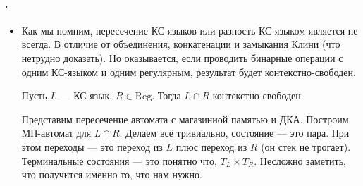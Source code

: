 \documentclass{article}
\begin{document}
    \paragraph{.}
    \begin{itemize}
        \item[]
        \begin{Comment}
            Как мы помним, пересечение КС-языков или разность КС-языком является не всегда. В отличие от объединения, конкатенации и замыкания Клини (что нетрудно доказать). Но оказывается, если проводить бинарные операции с одним КС-языком и одним регулярным, результат будет контекстно-свободен.
        \end{Comment}
        \thm Пусть $L$ --- КС-язык, $R\in\mathrm{Reg}$. Тогда $L\cap R$ контекстно-свободен.
        \begin{Proof}
            Представим пересечение автомата с магазинной памятью и ДКА. Построим МП-автомат для $L\cap R$. Делаем всё тривиально, состояние --- это пара. При этом переходы --- это переход из $L$ плюс переход из $R$ (он стек не трогает). Терминальные состояния --- это понятно что, $T_L\times T_R$. Несложно заметить, что получится именно то, что нам нужно.
        \end{Proof}
    \end{itemize}
\end{document}
